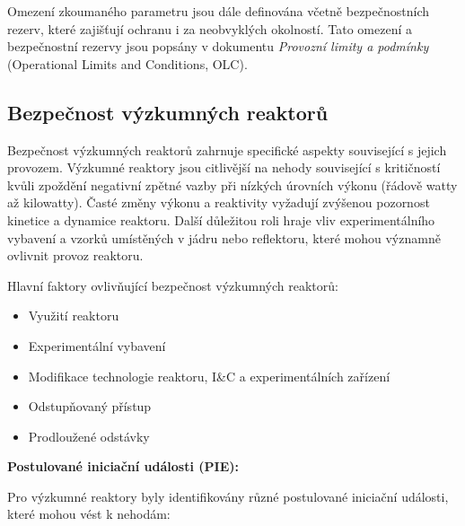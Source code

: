 Omezení zkoumaného parametru jsou dále definována včetně bezpečnostních rezerv, které zajišťují ochranu i za neobvyklých okolností. Tato omezení a bezpečnostní rezervy jsou popsány v dokumentu \textit{Provozní limity a podmínky} (Operational Limits and Conditions, OLC).

\subsection{Bezpečnost výzkumných reaktorů}

Bezpečnost výzkumných reaktorů zahrnuje specifické aspekty související s jejich provozem. Výzkumné reaktory jsou citlivější na nehody související s kritičností kvůli zpoždění negativní zpětné vazby při nízkých úrovních výkonu (řádově watty až kilowatty). Časté změny výkonu a reaktivity vyžadují zvýšenou pozornost kinetice a dynamice reaktoru. Další důležitou roli hraje vliv experimentálního vybavení a vzorků umístěných v jádru nebo reflektoru, které mohou významně ovlivnit provoz reaktoru.

Hlavní faktory ovlivňující bezpečnost výzkumných reaktorů:

\begin{itemize}
    \item Využití reaktoru
    \item Experimentální vybavení
    \item Modifikace technologie reaktoru, I\&C a experimentálních zařízení
    \item Odstupňovaný přístup
    \item Prodloužené odstávky
\end{itemize}

\textbf{Postulované iniciační události (PIE):}

Pro výzkumné reaktory byly identifikovány různé postulované iniciační události, které mohou vést k nehodám:

